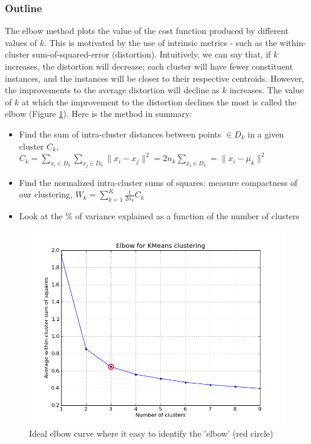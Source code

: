\subsubsection{Outline}
The elbow method plots the value of the cost function produced by different values of $k$. This is motivated by the use of intrinsic metrics - such as the within-cluster sum-of-squared-error (distortion). Intuitively, we can say that, if $k$ increases, the distortion will decrease; each cluster will have fewer constituent instances, and the instances will be closer to their respective centroids. However, the improvements to the average distortion will decline as $k$ increases. The value of $k$ at which the improvement to the distortion declines the most is called the elbow (Figure \ref{fig: elbow}). Here is the method in summary:
\begin{itemize}
	\item Find the sum of intra-cluster distances between points $\in D_k$ in a given cluster $C_k$, \\$C_k=\sum\limits_{x_i \in D_k}\sum\limits_{x_j \in D_k} \lVert x_i-x_j \rVert ^2 = 2n_k \sum\limits_{x_i \in D_k} = \lVert x_i - \mu _k \rVert ^2$
	\item Find the normalized intra-cluster sums of squares: measure compactness of our clustering, $W_k = \sum\limits_{k=1}^K \frac{1}{2n_k}C_k$
	\item Look at the $\%$ of variance explained as a function of the number of clusters
\end{itemize}

\begin{figure}[h] 
	\centering
	\includegraphics[scale= 0.5]{Figures/elbow_curve_expected.png}
	\caption{Ideal elbow curve where it easy to identify the 'elbow' (red circle)}
	\label{fig: elbow}
\end{figure}

